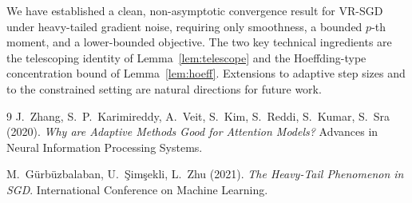 \documentclass[11pt]{article}
\theoremstyle{definition}
\begin{document}
We have established a clean, non-asymptotic convergence result for VR-SGD under heavy-tailed gradient noise, requiring only smoothness, a bounded $p$-th moment, and a lower-bounded objective. The two key technical ingredients are the telescoping identity of Lemma~\ref{lem:telescope} and the Hoeffding-type concentration bound of Lemma~\ref{lem:hoeff}. Extensions to adaptive step sizes and to the constrained setting are natural directions for future work.

\begin{thebibliography}{9}
J.\ Zhang, S.\ P.\ Karimireddy, A.\ Veit, S.\ Kim, S.\ Reddi, S.\ Kumar, S.\ Sra (2020).
\emph{Why are Adaptive Methods Good for Attention Models?}
Advances in Neural Information Processing Systems.

M.\ G\"urb\"uzbalaban, U.\ \c{S}im\c{s}ekli, L.\ Zhu (2021).
\emph{The Heavy-Tail Phenomenon in SGD}.
International Conference on Machine Learning.
\end{thebibliography}
\end{document}
